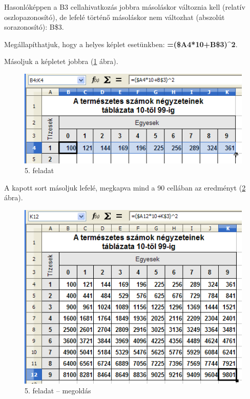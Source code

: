 Hasonlóképpen a B3 cellahivatkozás jobbra másoláskor
változnia kell (relatív oszlopazonosító), de lefelé
történő másoláskor nem változhat (abszolút
sorazonosító): B\$3.

Megállapíthatjuk, hogy a helyes képlet esetünkben:
\textsf{\textbf{\textcolor[rgb]{0.5019608,0.0,0.0}{=(\$A4*10+B\$3)\^{}2}}}.

Másoljuk a képletet jobbra (\ref{5-feladat-2} ábra).

\begin{figure}[!h]
\begin{center}
\includegraphics[width=12.275cm]{oocalcv1-img28.png}
\caption{5. feladat}\label{5-feladat-2}
\end{center}
\end{figure}

A kapott sort másoljuk lefelé, megkapva mind a 90 cellában az
eredményt (\ref{5-feladat-3} ábra).

\begin{figure}[!h]
\begin{center}
\includegraphics[width=12.222cm]{oocalcv1-img29.png}
\caption{5. feladat --  megoldás}\label{5-feladat-3}
\end{center}
\end{figure}

